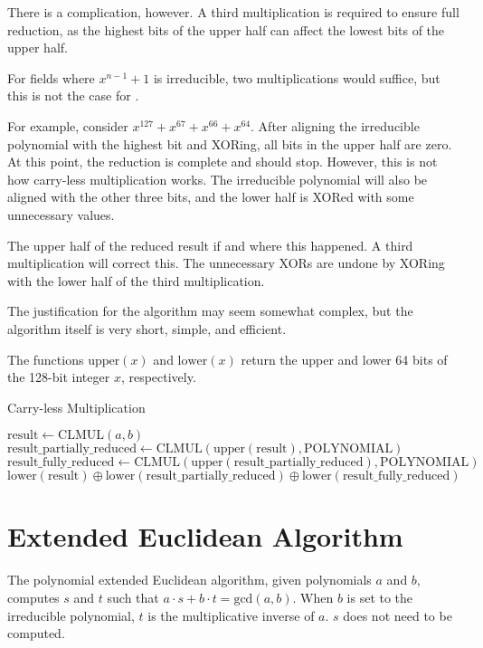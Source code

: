 There is a complication, however.
A third multiplication is required to ensure full reduction, as the highest bits of the upper half can affect the lowest bits of the upper half.

For fields where $x^{n - 1} + 1$ is irreducible, two multiplications would suffice, but this is not the case for .

For example, consider $x^{127} + x^{67} + x^{66} + x^{64}$.
After aligning the irreducible polynomial with the highest bit and XORing, all bits in the upper half are zero.
At this point, the reduction is complete and should stop.
However, this is not how carry-less multiplication works.
The irreducible polynomial will also be aligned with the other three bits, and the lower half is XORed with some unnecessary values.

The upper half of the reduced result if and where this happened. A third multiplication will correct this.
The unnecessary XORs are undone by XORing with the lower half of the third multiplication.

The justification for the algorithm may seem somewhat complex, but the algorithm itself is very short, simple, and efficient.

The functions $\text{upper}(x)$ and $\text{lower}(x)$ return the upper and lower 64 bits of the 128-bit integer $x$, respectively.

\begin{algorithm}
\caption{Carry-less Multiplication}
\begin{algorithmic}
\State $\text{result} \gets \text{CLMUL}(a, b)$
\State $\text{result\_partially\_reduced} \gets \text{CLMUL}(\text{upper}(\text{result}), \text{POLYNOMIAL})$
\State $\text{result\_fully\_reduced} \gets \text{CLMUL}(\text{upper}(\text{result\_partially\_reduced}), \text{POLYNOMIAL})$
\State \Return $\text{lower}(\text{result}) \oplus \text{lower}(\text{result\_partially\_reduced}) \oplus \text{lower}(\text{result\_fully\_reduced})$
\EndFunction
\end{algorithmic}
\end{algorithm}

\section{Extended Euclidean Algorithm}

The polynomial extended Euclidean algorithm, given polynomials $a$ and $b$, computes $s$ and $t$ such that $a \cdot s + b \cdot t = \text{gcd}(a, b)$.
When $b$ is set to the irreducible polynomial, $t$ is the multiplicative inverse of $a$. $s$ does not need to be computed.

